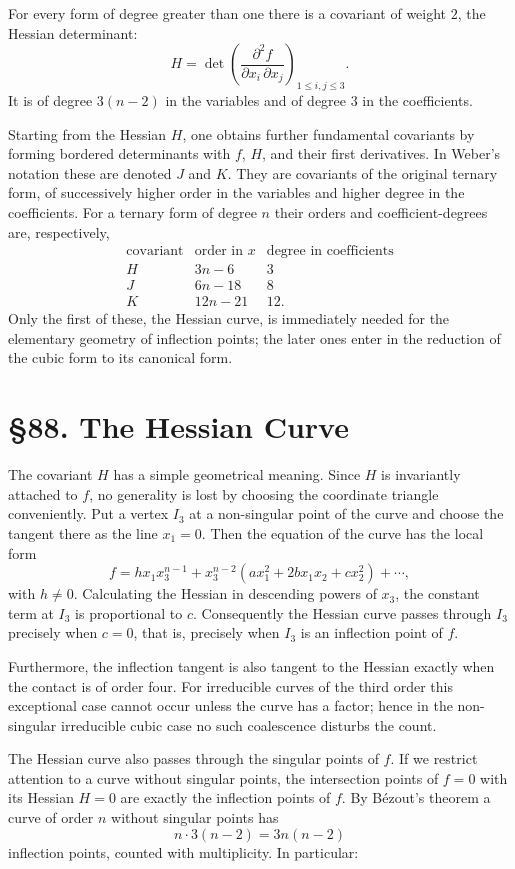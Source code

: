 \documentclass[11pt,a4paper]{book}
\newcommand{\webersection}[2]{\clearpage\section*{\S #1. #2}}
\begin{document}
For every form of degree greater than one there is a covariant of weight \(2\), the Hessian determinant:
\[
H=\det\left(\frac{\partial^2 f}{\partial x_i\,\partial x_j}\right)_{1\le i,j\le 3}.
\]
It is of degree \(3(n-2)\) in the variables and of degree \(3\) in the coefficients.

Starting from the Hessian \(H\), one obtains further fundamental covariants by forming bordered determinants with \(f\), \(H\), and their first derivatives.  In Weber's notation these are denoted \(J\) and \(K\).  They are covariants of the original ternary form, of successively higher order in the variables and higher degree in the coefficients.  For a ternary form of degree \(n\) their orders and coefficient-degrees are, respectively,
\[
\begin{array}{c|c|c}
\text{covariant} & \text{order in }x & \text{degree in coefficients}\\
\hline
H & 3n-6 & 3\\
J & 6n-18 & 8\\
K & 12n-21 & 12.
\end{array}
\]
Only the first of these, the Hessian curve, is immediately needed for the elementary geometry of inflection points; the later ones enter in the reduction of the cubic form to its canonical form.

\webersection{88}{The Hessian Curve}

The covariant \(H\) has a simple geometrical meaning.  Since \(H\) is invariantly attached to \(f\), no generality is lost by choosing the coordinate triangle conveniently.  Put a vertex \(I_3\) at a non-singular point of the curve and choose the tangent there as the line \(x_1=0\).  Then the equation of the curve has the local form
\[
f=hx_1x_3^{n-1}
+x_3^{n-2}(ax_1^2+2bx_1x_2+cx_2^2)
+\cdots ,
\]
with \(h\ne0\).  Calculating the Hessian in descending powers of \(x_3\), the constant term at \(I_3\) is proportional to \(c\).  Consequently the Hessian curve passes through \(I_3\) precisely when \(c=0\), that is, precisely when \(I_3\) is an inflection point of \(f\).

Furthermore, the inflection tangent is also tangent to the Hessian exactly when the contact is of order four.  For irreducible curves of the third order this exceptional case cannot occur unless the curve has a factor; hence in the non-singular irreducible cubic case no such coalescence disturbs the count.

The Hessian curve also passes through the singular points of \(f\).  If we restrict attention to a curve without singular points, the intersection points of \(f=0\) with its Hessian \(H=0\) are exactly the inflection points of \(f\).  By Bézout's theorem a curve of order \(n\) without singular points has
\[
n\cdot 3(n-2)=3n(n-2)
\]
inflection points, counted with multiplicity.  In particular:
\end{document}
